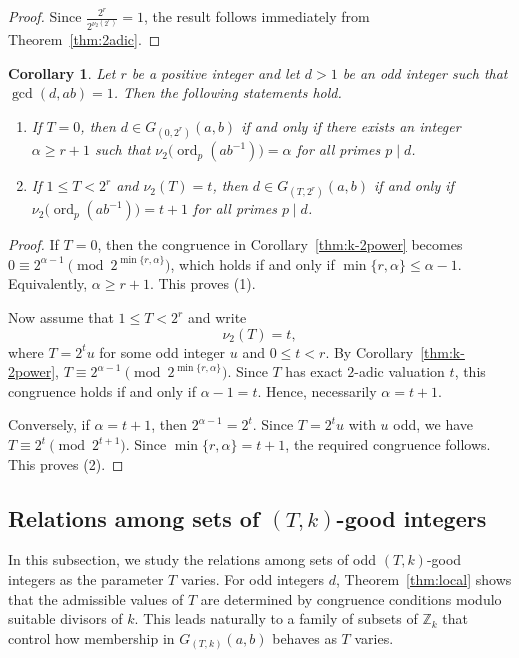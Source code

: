 \documentclass[pdflatex,sn-mathphys-num]{sn-jnl}%
\theoremstyle{thmstyleone}%
\newtheorem{corollary}[theorem]{Corollary}%
\theoremstyle{thmstyletwo}%
\theoremstyle{thmstylethree}%
\newcommand{\Z}{\mathbb{Z}}
\newcommand{\ord}{\operatorname{ord}}
\begin{document}
\begin{proof}
Since $
\frac{2^r}{2^{\nu_2(2^r)}}=1$, the result  follows immediately from Theorem~\ref{thm:2adic}.
\end{proof}

\begin{corollary}\label{cor:k-2power}
Let $r$ be a positive integer and let $d>1$ be an odd integer such that  $\gcd(d,ab)=1$. Then the following statements  hold.
\begin{enumerate}
\item If $T=0$, then
$
d\in G_{(0,2^r)}(a,b)$
if and only if there exists an integer $\alpha\ge r+1$ such that
$
\nu_2\bigl(\ord_p(ab^{-1})\bigr)=\alpha$
for all primes $p\mid d$.

\item If $1\le T<2^r$ and $\nu_2(T)=t$, then
$
d\in G_{(T,2^r)}(a,b)
$
if and only if
$
\nu_2\bigl(\ord_p(ab^{-1})\bigr)=t+1$ 
for all primes $p\mid d$.
\end{enumerate}
\end{corollary}

\begin{proof}
If $T=0$, then the congruence in Corollary~\ref{thm:k-2power} becomes
$
0\equiv 2^{\alpha-1}\pmod{2^{\min\{r,\alpha\}}}$,
which holds if and only if $\min\{r,\alpha\}\le \alpha-1$.  Equivalently, $\alpha\ge r+1$. This proves \textup{(1)}.

Now assume that $1\le T<2^r$ and write
\[
\nu_2(T)=t,
\]
where 
$
T=2^t u$ 
for some odd integer $u$ and  $0\le t<r$. By Corollary~\ref{thm:k-2power},
$
T\equiv 2^{\alpha-1}\pmod{2^{\min\{r,\alpha\}}}$.
Since $T$ has exact $2$-adic valuation $t$, this congruence holds if and only if
$
\alpha-1=t$. 
Hence, necessarily $
\alpha=t+1$.

Conversely, if $\alpha=t+1$, then
$
2^{\alpha-1}=2^t$. 
Since $T=2^t u$ with $u$ odd, we have
$
T\equiv 2^t \pmod{2^{t+1}}$. Since
$
\min\{r,\alpha\}=t+1$,
the required congruence follows. This proves \textup{(2)}.
\end{proof}


\subsection{Relations among sets of $(T,k)$-good integers}

In this subsection, we study the relations among sets of odd $(T,k)$-good integers as the parameter $T$ varies. For odd integers $d$, Theorem~\ref{thm:local} shows that the admissible values of $T$ are determined by congruence conditions modulo suitable divisors of $k$. This leads naturally to a family of subsets of $\Z_k$ that control how membership in $G_{(T,k)}(a,b)$ behaves  as $T$ varies.
\end{document}
